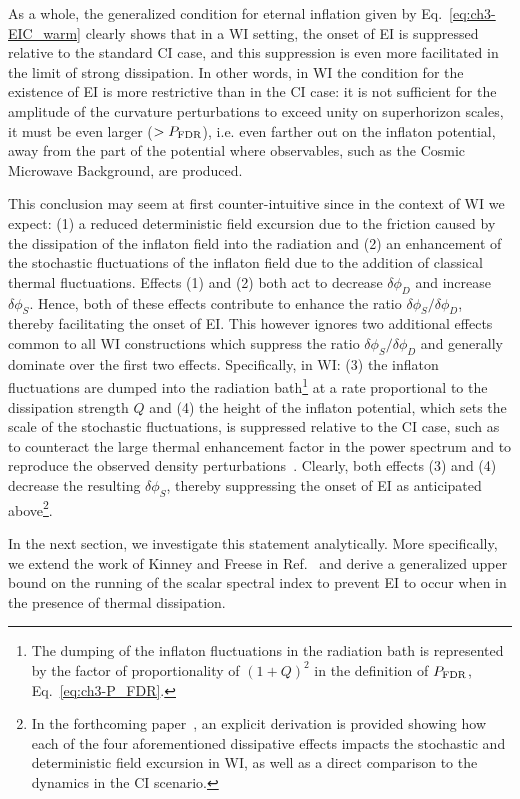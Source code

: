 As a whole, the generalized condition for eternal inflation given by
Eq.~\ref{eq:ch3-EIC_warm} clearly shows that in a WI setting, the onset of EI is suppressed relative to the standard CI case, and
this suppression is even more facilitated in the limit of strong dissipation. In other words, in WI the condition for the existence of EI is more restrictive than in the CI case: it is not sufficient for the amplitude of the curvature perturbations to exceed unity on superhorizon scales, it must be even larger ($>P_{\rm{FDR}}$), i.e. even farther
out on the inflaton potential, away from the part of the potential where observables, such as the Cosmic
Microwave Background, are produced.

This
conclusion may seem at first counter-intuitive since in the context of
WI we expect: (1) a reduced deterministic field excursion due to the
friction caused by the dissipation of the inflaton field into the
radiation and (2) an enhancement of the stochastic fluctuations of the
inflaton field due to the addition of classical thermal
fluctuations. Effects (1) and (2) both act to decrease
$\delta\phi_D$ and increase $\delta\phi_S$. Hence, both of these
effects contribute to enhance the ratio $\delta\phi_S/\delta\phi_D$,
thereby facilitating the onset of EI. This however ignores two
additional effects common to all WI constructions which suppress the
ratio $\delta\phi_S/\delta\phi_D$ and generally dominate over the
first two effects. Specifically, in WI: (3) the inflaton fluctuations
are dumped into the radiation bath\footnote{The dumping of the
inflaton fluctuations in the radiation bath is represented by the
factor of proportionality of $(1+Q)^2$ in the definition of
$P_{\rm{FDR}}$, Eq.~\ref{eq:ch3-P_FDR}. } at a rate proportional to the
dissipation strength $Q$ and (4) the height of the inflaton potential,
which sets the scale of the stochastic fluctuations, is suppressed
relative to the CI case, such as to counteract the large thermal
enhancement factor in the power spectrum and to reproduce the observed
density perturbations~\cite{Montefalcone:2022owy}. Clearly, both
effects (3) and (4) decrease the resulting $\delta\phi_S$, thereby
suppressing the onset of EI as anticipated above\footnote{In the
forthcoming paper~\cite{MRVFeistudy}, an explicit derivation is
provided showing how each of the four aforementioned dissipative
effects impacts the stochastic and deterministic field excursion in
WI, as well as a direct comparison to the dynamics in the CI
scenario.}.

In the next section, we investigate this statement analytically. More
specifically, we extend the work of Kinney and Freese in
Ref.~\cite{Kinney:2014jya} and derive a generalized upper bound on the
running of the scalar spectral index to prevent EI to occur when in
the presence of thermal dissipation.


